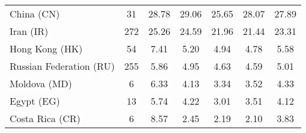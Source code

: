 \begin{table}[h!]
{\begin{tabular}{lcccccc}
China (CN) & \color{black} 31 & {\cellcolor[HTML]{7CB7DA}} \color[HTML]{000000} \color{black} 28.78 & {\cellcolor[HTML]{6AAED6}} \color[HTML]{F1F1F1} \color{black} 29.06 & {\cellcolor[HTML]{F7FBFF}} \color[HTML]{000000} \color{black} 25.65 & {\cellcolor[HTML]{A5CDE3}} \color[HTML]{000000} \color{black} 28.07 & \color{black} 27.89 \\
Iran (IR) & \color{black} 272 & {\cellcolor[HTML]{6AAED6}} \color[HTML]{F1F1F1} \color{black} 25.26 & {\cellcolor[HTML]{8FC2DE}} \color[HTML]{000000} \color{black} 24.59 & {\cellcolor[HTML]{EAF2FB}} \color[HTML]{000000} \color{black} 21.96 & {\cellcolor[HTML]{F7FBFF}} \color[HTML]{000000} \color{black} 21.44 & \color{black} 23.31 \\
Hong Kong (HK) & \color{black} 54 & {\cellcolor[HTML]{6AAED6}} \color[HTML]{F1F1F1} \color{black} 7.41 & {\cellcolor[HTML]{E7F1FA}} \color[HTML]{000000} \color{black} 5.20 & {\cellcolor[HTML]{F1F7FD}} \color[HTML]{000000} \color{black} 4.94 & {\cellcolor[HTML]{F7FBFF}} \color[HTML]{000000} \color{black} 4.78 & \color{black} 5.58 \\
Russian Federation (RU) & \color{black} 255 & {\cellcolor[HTML]{6AAED6}} \color[HTML]{F1F1F1} \color{black} 5.86 & {\cellcolor[HTML]{DBE9F6}} \color[HTML]{000000} \color{black} 4.95 & {\cellcolor[HTML]{F4F9FE}} \color[HTML]{000000} \color{black} 4.63 & {\cellcolor[HTML]{F7FBFF}} \color[HTML]{000000} \color{black} 4.59 & \color{black} 5.01 \\
Moldova (MD) & \color{black} 6 & {\cellcolor[HTML]{6AAED6}} \color[HTML]{F1F1F1} \color{black} 6.33 & {\cellcolor[HTML]{DCEAF6}} \color[HTML]{000000} \color{black} 4.13 & {\cellcolor[HTML]{F7FBFF}} \color[HTML]{000000} \color{black} 3.34 & {\cellcolor[HTML]{F2F7FD}} \color[HTML]{000000} \color{black} 3.52 & \color{black} 4.33 \\
Egypt (EG) & \color{black} 13 & {\cellcolor[HTML]{6CAED6}} \color[HTML]{F1F1F1} \color{black} 5.74 & {\cellcolor[HTML]{CCDFF1}} \color[HTML]{000000} \color{black} 4.22 & {\cellcolor[HTML]{F7FBFF}} \color[HTML]{000000} \color{black} 3.01 & {\cellcolor[HTML]{E5EFF9}} \color[HTML]{000000} \color{black} 3.51 & \color{black} 4.12 \\
Costa Rica (CR) & \color{black} 6 & {\cellcolor[HTML]{6CAED6}} \color[HTML]{F1F1F1} \color{black} 8.57 & {\cellcolor[HTML]{F2F8FD}} \color[HTML]{000000} \color{black} 2.45 & {\cellcolor[HTML]{F6FAFF}} \color[HTML]{000000} \color{black} 2.19 & {\cellcolor[HTML]{F7FBFF}} \color[HTML]{000000} \color{black} 2.10 & \color{black} 3.83 \\

\end{tabular}}
\end{table}
